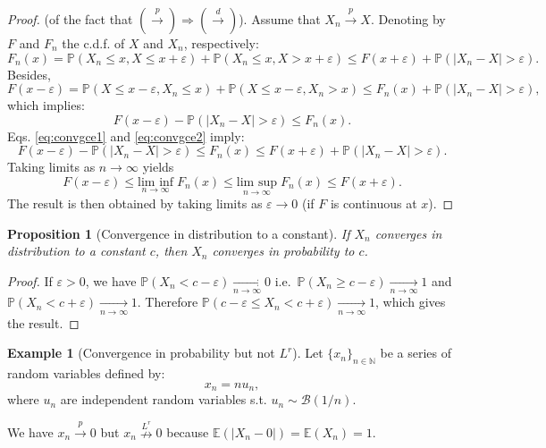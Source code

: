 \documentclass[
  12pt,
]{book}
\newtheorem{proposition}{Proposition}[chapter]
\theoremstyle{definition}
\theoremstyle{definition}
\newtheorem{example}{Example}[chapter]
\theoremstyle{definition}
\theoremstyle{definition}
\theoremstyle{remark}
\begin{document}
\begin{proof}
(of the fact that \(\left(\overset{p}{\rightarrow}\right) \Rightarrow \left( \overset{d}{\rightarrow}\right)\)). Assume that \(X_n \overset{p}{\rightarrow} X\). Denoting by \(F\) and \(F_n\) the c.d.f. of \(X\) and \(X_n\), respectively:
\begin{equation}
F_n(x) = \mathbb{P}(X_n \le x,X\le x+\varepsilon) + \mathbb{P}(X_n \le x,X > x+\varepsilon) \le F(x+\varepsilon) + \mathbb{P}(|X_n - X|>\varepsilon).\label{eq:convgce1}
\end{equation}
Besides,
\[
F(x-\varepsilon) = \mathbb{P}(X \le x-\varepsilon,X_n \le x) + \mathbb{P}(X \le x-\varepsilon,X_n > x) \le F_n(x) + \mathbb{P}(|X_n - X|>\varepsilon),
\]
which implies:
\begin{equation}
F(x-\varepsilon) - \mathbb{P}(|X_n - X|>\varepsilon) \le F_n(x).\label{eq:convgce2}
\end{equation}
Eqs. \eqref{eq:convgce1} and \eqref{eq:convgce2} imply:
\[
F(x-\varepsilon) - \mathbb{P}(|X_n - X|>\varepsilon) \le F_n(x)  \le F(x+\varepsilon) + \mathbb{P}(|X_n - X|>\varepsilon).
\]
Taking limits as \(n \rightarrow \infty\) yields
\[
F(x-\varepsilon) \le \underset{n \rightarrow \infty}{\mbox{lim inf}}\; F_n(x) \le \underset{n \rightarrow \infty}{\mbox{lim sup}}\; F_n(x)  \le F(x+\varepsilon).
\]
The result is then obtained by taking limits as \(\varepsilon \rightarrow 0\) (if \(F\) is continuous at \(x\)).
\end{proof}

\begin{proposition}[Convergence in distribution to a constant]
\protect\hypertarget{prp:cvgce11}{}\label{prp:cvgce11}If \(X_n\) converges in distribution to a constant \(c\), then \(X_n\) converges in probability to \(c\).
\end{proposition}

\begin{proof}
If \(\varepsilon>0\), we have \(\mathbb{P}(X_n < c - \varepsilon) \underset{n \rightarrow \infty}{\rightarrow} 0\) i.e.~\(\mathbb{P}(X_n \ge c - \varepsilon) \underset{n \rightarrow \infty}{\rightarrow} 1\) and \(\mathbb{P}(X_n < c + \varepsilon) \underset{n \rightarrow \infty}{\rightarrow} 1\). Therefore \(\mathbb{P}(c - \varepsilon \le X_n < c + \varepsilon) \underset{n \rightarrow \infty}{\rightarrow} 1\),
which gives the result.
\end{proof}

\begin{example}[Convergence in probability but not $L^r$]
\protect\hypertarget{exm:plimButNotLr}{}\label{exm:plimButNotLr}Let \(\{x_n\}_{n \in \mathbb{N}}\) be a series of random variables defined by:
\[
x_n = n u_n,
\]
where \(u_n\) are independent random variables s.t. \(u_n \sim \mathcal{B}(1/n)\).

We have \(x_n \overset{p}{\rightarrow} 0\) but \(x_n \overset{L^r}{\nrightarrow} 0\) because \(\mathbb{E}(|X_n-0|)=\mathbb{E}(X_n)=1\).
\end{example}
\end{document}
